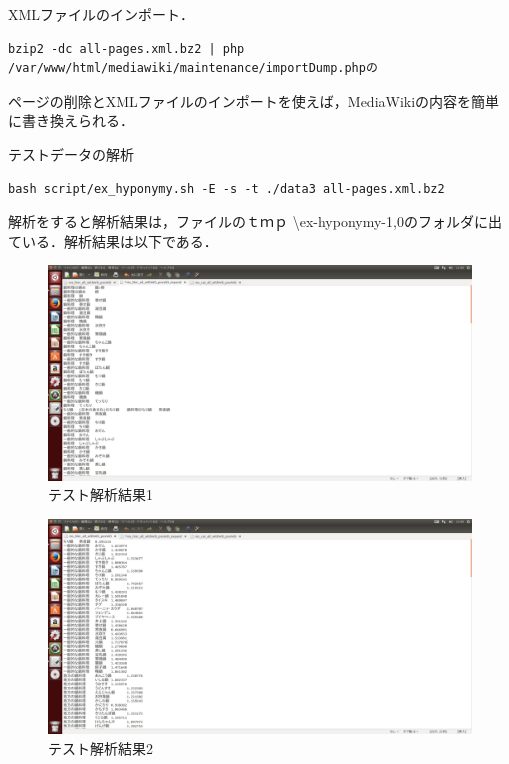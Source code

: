 XMLファイルのインポート．
{\small
\begin{verbatim}
bzip2 -dc all-pages.xml.bz2 | php /var/www/html/mediawiki/maintenance/importDump.phpの
\end{verbatim}}

ページの削除とXMLファイルのインポートを使えば，MediaWikiの内容を簡単に書き換えられる．

テストデータの解析
{\small
\begin{verbatim}
bash script/ex_hyponymy.sh -E -s -t ./data3 all-pages.xml.bz2
\end{verbatim}}

解析をすると解析結果は，ファイルのｔｍｐ \textbackslash ex-hyponymy-1,0のフォルダに出ている．解析結果は以下である．

\begin{figure}[!htb]
\centering
\includegraphics[width=18cm]{kaiseki1}
\caption{テスト解析結果1}\label{kaiseki1}
\end{figure}

\begin{figure}[!htb]
\centering
\includegraphics[width=18cm]{kaiseki2}
\caption{テスト解析結果2}\label{kaiseki2}
\end{figure}







